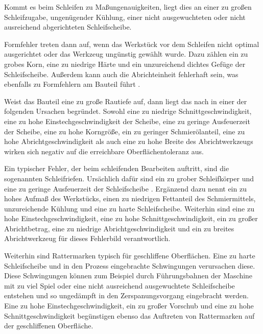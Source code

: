 Kommt es beim Schleifen zu Maßungenauigkeiten, liegt dies an einer zu großen Schleifzugabe, ungenügender Kühlung, einer nicht ausgewuchteten oder nicht ausreichend abgerichteten Schleifscheibe. 

Formfehler treten dann auf, wenn das Werkstück vor dem Schleifen nicht optimal ausgerichtet oder das Werkzeug ungünstig gewählt wurde. Dazu zählen ein zu grobes Korn, eine zu niedrige Härte und ein unzureichend dichtes Gefüge der Schleifscheibe. Außerdem kann auch die Abrichteinheit fehlerhaft sein, was ebenfalls zu Formfehlern am Bauteil führt \cite{Winkler.1990}. 

Weist das Bauteil eine zu große Rautiefe auf, dann liegt das nach \cite{Winkler.1990} in einer der folgenden Ursachen begründet. Sowohl eine zu niedrige Schnittgeschwindigkeit, eine zu hohe Einstechgeschwindigkeit der Scheibe, eine zu geringe Ausfeuerzeit der Scheibe, eine zu hohe Korngröße, ein zu geringer Schmierölanteil, eine zu hohe Abrichtgeschwindigkeit als auch eine zu hohe Breite des Abrichtwerkzeugs wirken sich negativ auf die erreichbare Oberflächentoleranz aus. 

Ein typischer Fehler, der beim schleifenden Bearbeiten auftritt, sind die sogenannten Schleifriefen. Ursächlich dafür sind ein zu grober Schleifkörper und eine zu geringe Ausfeuerzeit der Schleifscheibe \cite{Dietrich.2014}.      
Ergänzend dazu nennt \cite{Winkler.1990} ein zu hohes Aufmaß des Werkstücks, einen zu niedrigen Fettanteil des Schmiermittels, unzureichende Kühlung und eine zu harte Schleifscheibe. Weiterhin sind eine zu hohe Einstechgeschwindigkeit, eine zu hohe Schnittgeschwindigkeit, ein zu großer Abrichtbetrag, eine zu niedrige Abrichtgeschwindigkeit und ein zu breites Abrichtwerkzeug für dieses Fehlerbild verantwortlich.

Weiterhin sind Rattermarken typisch für geschliffene Oberflächen. Eine zu harte Schleifscheibe und in den Prozess eingebrachte Schwingungen verursachen diese. Diese Schwingungen können zum Beispiel durch Führungsbahnen der Maschine mit zu viel Spiel oder eine nicht ausreichend ausgewuchtete Schleifscheibe entstehen und so ungedämpft in den Zerspanungsvorgang eingebracht werden. Eine zu hohe Einstechgeschwindigkeit, ein zu großer Vorschub und eine zu hohe Schnittgeschwindigkeit begünstigen ebenso das Auftreten von Rattermarken auf der geschliffenen Oberfläche.     





 

      





 

   
     



      







